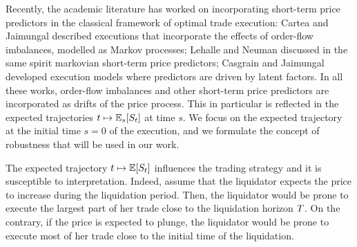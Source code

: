 \documentclass[10pt,a4paper]{article}
\begin{document}
%	

	Recently, the academic literature has worked on incorporating short-term price predictors in the classical framework of optimal trade execution: Cartea and Jaimungal \cite{CJ16inc} described executions that incorporate the effects of order-flow imbalances, modelled as Markov processes;  Lehalle and Neuman \cite{LN19inc} discussed in the same spirit  markovian short-term price predictors; Casgrain and Jaimungal \cite{CJ19tra} developed execution models where  predictors are driven by latent factors.
	In all these works, order-flow imbalances and other short-term price predictors are incorporated as drifts of the price process. This in particular is reflected in the expected trajectories $t\mapsto\mathbb{{E}}_s [S_{t}]$ at time $s$. We focus on the expected trajectory at the initial time $s=0$ of the execution, and we formulate the concept of robustness that will be used in our work. 
	
	The expected trajectory $t\mapsto \mathbb{{E}} [S_t]$ influences the trading strategy and it is susceptible to interpretation. Indeed, assume that the liquidator expects the price to increase during the liquidation period. Then, the liquidator would be prone to execute the largest part of her trade close to the liquidation horizon $T$. On the contrary, if the price is expected to plunge, the liquidator would be prone to execute most of her trade close to the initial time of the liquidation. 
	
\end{document}
